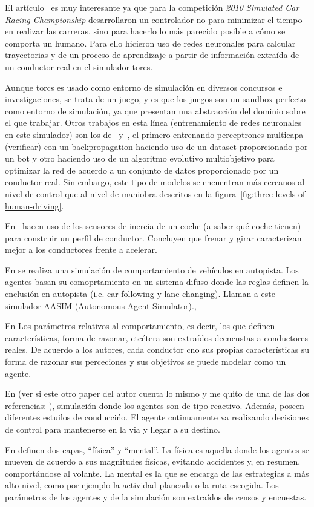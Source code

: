 El artículo~\cite{munoz2010human} es muy interesante ya que para la competición \textit{2010 Simulated Car Racing Championship} desarrollaron un controlador no para minimizar el tiempo en realizar las carreras, sino para hacerlo lo más parecido posible a cómo se comporta un humano. Para ello hicieron uso de redes neuronales para calcular trayectorias y de un proceso de aprendizaje a partir de información extraída de un conductor real en el simulador \gls{torcs}.

Aunque \gls{torcs} es usado como entorno de simulación en diversos concursos e investigaciones, se trata de un juego, y es que los juegos son un sandbox perfecto como entorno de simulación, ya que presentan una abstracción del dominio sobre el que trabajar. Otros trabajos en esta línea (entrenamiento de redes neuronales en este simulador) son los de~\cite{munoz2009controller} y~\cite{van2009robust}, el primero entrenando perceptrones multicapa (\TODO verificar) con un backpropagation haciendo uso de un dataset proporcionado por un bot y otro haciendo uso de un algoritmo evolutivo multiobjetivo para optimizar la red de acuerdo a un conjunto de datos proporcionado por un conductor real. Sin embargo, este tipo de modelos se encuentran más cercanos al nivel de control que al nivel de maniobra descritos en la figura~\ref{fig:three-levels-of-human-driving}.

En~\cite{van2013driver} hacen uso de los sensores de inercia de un coche (a saber qué coche tienen) para construir un perfil de conductor. Concluyen que frenar y girar caracterizan mejor a los conductores frente a acelerar.

En \cite{Das} se realiza una simulación de comportamiento de vehículos en autopista. Los agentes basan su comoprtamiento en un sistema difuso donde las reglas definen la cnclusión en autopista (i.e. car-following y lane-changing). Llaman a este simulador AASIM (Autonomous Agent Simulator).,

En \cite{Dia2002} Los parámetros relativos al comportamiento, es decir, los que definen características, forma de razonar, etcétera son extraídos deencustas a conductores reales. De acuerdo a los autores, cada conductor cno sus propias características su forma de razonar sus perceciones y sus objetivos se puede modelar como un agente.

En \cite{Ehlert2001} (ver si este otro paper del autor cuenta lo mismo y me quito de una de las dos referencias: \cite{Ehlert2001-2}), simulación donde los agentes son de tipo reactivo. Además, poseen diferentes estuilos de conduccińo. El agente cntinuamente va realizando decisiones de control para mantenerse en la via y llegar a su destino.

En \cite{} definen dos capas, \enquote{física} y \enquote{mental}. La física es aquella donde los agentes se mueven de acuerdo a sus magnitudes físicas, evitando accidentes y, en resumen, comportándose al volante. La mental es la que se encarga de las estrategias a más alto nivel, como por ejemplo la actividad planeada o la ruta escogida. Los parámetros de los agentes y de la simulación son extraídos de censos y encuestas.